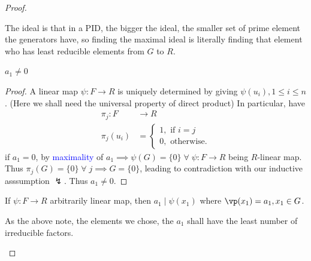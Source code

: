 \begin{proof}
\begin{enumerate}
		      \begin{intuition}
			      The ideal is that in a PID, the bigger the ideal, the smaller set of prime element the
			      generators have, so finding the maximal ideal is literally finding that element who has
			      least reducible elements from \( G \) to \( R \).
		      \end{intuition}

		      \begin{claim}
			      \( a_1 \ne 0 \)
		      \end{claim}
		      \begin{proof}
			      A linear map \( \psi : F \to R \) is uniquely determined by giving \( \psi (u_i), 1 \leq
			      i \leq n\). (Here we shall need the universal property of direct product) In particular, have
			      \[
				      \begin{aligned}
					      \pi_j : F  & \to R \\
					      \pi_j(u_i) & =
					      \begin{cases}
						      1, \text{ if } i  = j \\
						      0, \text{ otherwise.}
					      \end{cases}
				      \end{aligned}
			      \]
			      if \( a_1 = 0 \), by \textcolor{blue}{maximality} of \( a_1 \implies \psi(G) = \{0\} \; \forall \; \psi :
			      F \to R\) being \( R \)-linear map. Thus \( \pi_j(G) = \{0\} \; \forall \; j \implies G
			      = \{0\}\), leading to contradiction with our inductive asssumption \( \lightning \).
			      Thus \( a_1 \ne 0 \).
		      \end{proof}
		      \begin{claim}
			      If \( \psi: F \to R \) arbitrarily linear map, then \( a_1 \mid \psi(x_1) \) where \(
			      \vp(x_1) = a_1, x_1 \in G \).
		      \end{claim}

		      \begin{intuition}
			      As the above note, the elements we chose, the \( a_1 \) shall have the least number of
			      irreducible factors.
		      \end{intuition}


\end{enumerate}
\end{proof}
